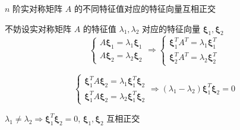 \begin{theorem}[实对称矩阵特征向量]
	$n$ 阶实对称矩阵 $A$ 的不同特征值对应的特征向量互相正交

	不妨设实对称矩阵 $A$ 的特征值 $\lambda_{1}, \lambda_{2}$ 对应的特征向量 $\boldsymbol{\xi}_{1}, \boldsymbol{\xi}_{2}$
	$$\begin{cases}
		A\boldsymbol{\xi}_{1} = \lambda_{1}\boldsymbol{\xi}_{1}\\
		A\boldsymbol{\xi}_{2} = \lambda_{2}\boldsymbol{\xi}_{2}
	\end{cases}\Rightarrow
	\begin{cases}
	   \boldsymbol{\xi}_{1}^{T}A^{T} = \lambda_{1}\boldsymbol{\xi}_{1}^{T}\\
	   \boldsymbol{\xi}_{2}^{T}A^{T} = \lambda_{2}\boldsymbol{\xi}_{2}^{T}
	\end{cases}$$

	$$\begin{cases}
		\boldsymbol{\xi}_{1}^{T}A\boldsymbol{\xi}_{2} = \lambda_{1}\boldsymbol{\xi}_{1}^{T}\boldsymbol{\xi}_{2}\\
		\boldsymbol{\xi}_{1}^{T}A\boldsymbol{\xi}_{2} = \lambda_{2}\boldsymbol{\xi}_{1}^{T}\boldsymbol{\xi}_{2}
	\end{cases}\Rightarrow
	(\lambda_{1} - \lambda_{2})\boldsymbol{\xi}_{1}^{T}\boldsymbol{\xi}_{2} = 0$$

	$\lambda_{1} \neq \lambda_{2} \Rightarrow \boldsymbol{\xi}_{1}^{T}\boldsymbol{\xi}_{2} = 0$, $\boldsymbol{\xi}_{1}, \boldsymbol{\xi}_{2}$ 互相正交
\end{theorem}

